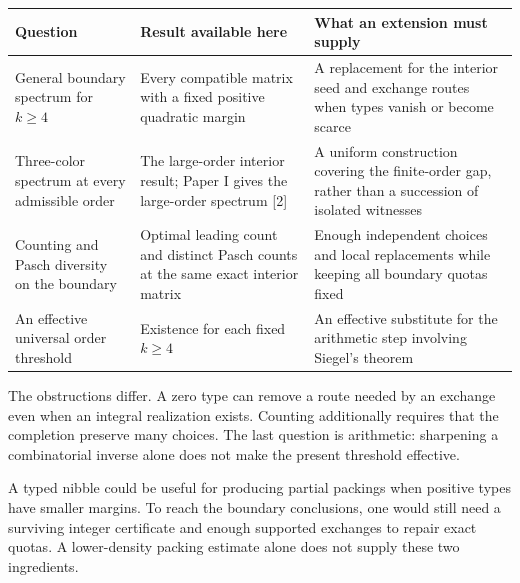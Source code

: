 \documentclass[english,11pt,a4paper]{article}
\begin{document}
{\begin{longtable}[]{@{}
  >{\raggedright\arraybackslash}p{}
  >{\raggedright\arraybackslash}p{}
  >{\raggedright\arraybackslash}p{}@{}}
\toprule\noalign{}
\begin{minipage}[b]{\linewidth}\raggedright
Question
\end{minipage} & \begin{minipage}[b]{\linewidth}\raggedright
Result available here
\end{minipage} & \begin{minipage}[b]{\linewidth}\raggedright
What an extension must supply
\end{minipage} \\
\midrule\noalign{}
\endhead
\bottomrule\noalign{}
\endlastfoot
General boundary spectrum for \(k\ge4\) & Every compatible matrix with a fixed positive quadratic margin & A replacement for the interior seed and exchange routes when types vanish or become scarce \\
Three-color spectrum at every admissible order & The large-order interior result; Paper I gives the large-order spectrum {[}2{]} & A uniform construction covering the finite-order gap, rather than a succession of isolated witnesses \\
Counting and Pasch diversity on the boundary & Optimal leading count and distinct Pasch counts at the same exact interior matrix & Enough independent choices and local replacements while keeping all boundary quotas fixed \\
An effective universal order threshold & Existence for each fixed \(k\ge4\) & An effective substitute for the arithmetic step involving Siegel's theorem \\
\end{longtable}
}

The obstructions differ. A zero type can remove a route needed by an exchange even when an integral realization exists. Counting additionally requires that the completion preserve many choices. The last question is arithmetic: sharpening a combinatorial inverse alone does not make the present threshold effective.

A typed nibble could be useful for producing partial packings when positive types have smaller margins. To reach the boundary conclusions, one would still need a surviving integer certificate and enough supported exchanges to repair exact quotas. A lower-density packing estimate alone does not supply these two ingredients.
\end{document}

